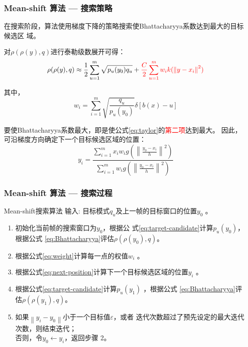 \documentclass[xcolor=svgnames,serif,table]{beamer}
\begin{document}
\begin{frame}
  \frametitle{Mean-shift 算法 --- 搜索策略}
  \small
  在搜索阶段，算法使用梯度下降的策略搜索使Bhattacharyya系数达到最大的目标候选区
  域。
  
    对$\rho(\rho(y),q)$进行泰勒级数展开可得：
\begin{equation}
  \label{eq:taylor}
  \rho(\rho(y),q)\approx \frac{1}{2}\sum_{u=1}^{m}\sqrt{p_u(y_0)q_u}+\textcolor{red}{\frac{C}{2}\sum_{u=1}^{m}w_{i}k(\left\|y-x_i\right\|^2)}
\end{equation}

其中，
\begin{equation}
    \label{eq:weight}
    w_{i}=\sum_{i=1}^{m}\sqrt{\frac{q_u}{p_{u}(y_0)}}\delta[b(x)-u]
\end{equation}

要使Bhattacharyya系数最大，即是使公式\ref{eq:taylor}的\textcolor{red}{第二项}达到最大。
因此，可沿梯度方向确定下一个目标候选区域的位置：
    \begin{equation}
    \label{eq:next-position}
    y_{i}=\frac{\sum_{i=1}^{m}x_{i}w_{i}g\left(\left\|\frac{y_0-x_i}{h}\right\|^{2}\right)}{\sum_{i=1}^{m}w_{i}g\left(\left\|\frac{y_0-x_i}{h}\right\|^{2}\right)}
  \end{equation}
\end{frame}

\begin{frame}
  \frametitle{Mean-shift 算法 --- 搜索过程}
  \begin{exampleblock}{Mean-shift搜索算法}
    \textcolor{black!60!green}{输入}: 目标模式$q_u$及上一帧的目标窗口的位置$y_0$ 。\vspace{-.5em}
    \begin{enumerate}[(S1)]
    \item 初始化当前帧的搜索窗口为$y_0$，根据公
    式\ref{eq:target-candidate}计算$p_u(y_0)$，根据公式
   \ref{eq:Bhattacharyya}评估$\rho(\rho(y_0),q)$。
    \item 根据公式\ref{eq:weight}计算每一点的权值$w_{i}$ 。
    \item 根据公式\ref{eq:next-position}计算下一个目标候选区域的位置$y_{i}$
   。
    \item 根据公式\ref{eq:target-candidate}计算$p_u(y_1)$ ，根据公式
   \ref{eq:Bhattacharyya}评估$\rho(\rho(y_1),q)$。
    \item 如果$\left\|y_{i}-y_{0}\right\|$小于一个目标值$\varepsilon$，或者
    迭代次数超过了预先设定的最大迭代次数，则结束迭代；\\
    否则，令$y_{0}\leftarrow y_{i}$，返回步骤 2。
    \end{enumerate}
  \end{exampleblock}
\end{frame}
\end{document}
